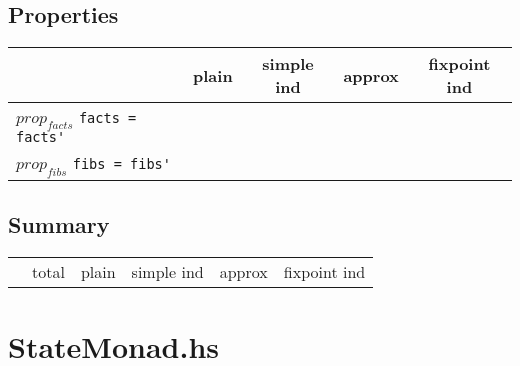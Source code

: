 \documentclass{article}
\begin{document}
\subsection*{Properties}
\begin{longtable}{p{10cm} || c | c | c | c | }
  & plain & simple ind & approx & fixpoint ind \\
\hline
$prop_{facts}$ \newline \verb`facts = facts'` &  &  &  &  \\
\hline
$prop_{fibs}$ \newline \verb`fibs = fibs'` &  &  &  &  \\
\end{longtable}

\subsection*{Summary}
\begin{longtable}{p{4cm} || c | c | c | c | c | }
  & total & plain & simple ind & approx & fixpoint ind \\
\end{longtable}

\section*{StateMonad.hs}
\end{document}
